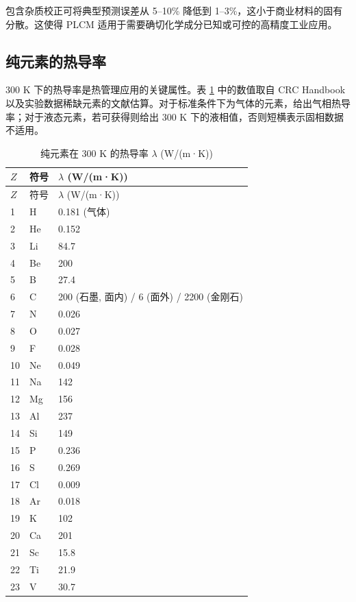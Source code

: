 \documentclass[12pt,a4paper]{article}
\begin{document}
	包含杂质校正可将典型预测误差从 5–10\% 降低到 1–3\%，这小于商业材料的固有分散。这使得 PLCM 适用于需要确切化学成分已知或可控的高精度工业应用。
	
	\subsection{纯元素的热导率}
	\label{subsec:thermal-conductivity-elements}
	
	300 K 下的热导率是热管理应用的关键属性。表 \ref{tab:thermal-conductivity-all} 中的数值取自 CRC Handbook \cite{CRC} 以及实验数据稀缺元素的文献估算。对于标准条件下为气体的元素，给出气相热导率；对于液态元素，若可获得则给出 300 K 下的液相值，否则短横表示固相数据不适用。
	
	\begin{longtable}{p{0.6cm}p{1.2cm}p{1.5cm}}
		\caption{纯元素在 300 K 的热导率 \(\lambda\) (W/(m·K))} \label{tab:thermal-conductivity-all} \\
		\toprule
		\(Z\) & 符号 & \(\lambda\) (W/(m·K)) \\
		\midrule
		\endfirsthead
		\toprule
		\(Z\) & 符号 & \(\lambda\) (W/(m·K)) \\
		\midrule
		\endhead
		1  & H  & 0.181 (气体) \\
		2  & He & 0.152 \\
		3  & Li & 84.7 \\
		4  & Be & 200 \\
		5  & B  & 27.4 \\
		6  & C  & 200 (石墨, 面内) / 6 (面外) / 2200 (金刚石) \\
		7  & N  & 0.026 \\
		8  & O  & 0.027 \\
		9  & F  & 0.028 \\
		10 & Ne & 0.049 \\
		11 & Na & 142 \\
		12 & Mg & 156 \\
		13 & Al & 237 \\
		14 & Si & 149 \\
		15 & P  & 0.236 \\
		16 & S  & 0.269 \\
		17 & Cl & 0.009 \\
		18 & Ar & 0.018 \\
		19 & K  & 102 \\
		20 & Ca & 201 \\
		21 & Sc & 15.8 \\
		22 & Ti & 21.9 \\
		23 & V  & 30.7 \\

\end{longtable}
\end{document}
